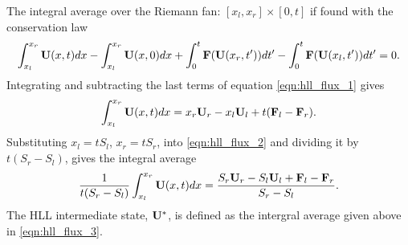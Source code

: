 

%

\label{app:hll_flux}

The integral average over the Riemann fan: $[x_l,x_r] \times [0,t]$ if found with the conservation law
\begin{gather}
\label{eqn:hll_flux_1}
\int_{x_l}^{x_r} \mathbf{U}(x,t) dx - \int_{x_l}^{x_r} \mathbf{U}(x,0) dx + \int_{0}^{t} \mathbf{F}(\mathbf{U}(x_r,t')) dt'
- \int_{0}^{t} \mathbf{F}(\mathbf{U}(x_l,t')) dt' = 0.
\end{gather}
Integrating and subtracting the last terms of equation \eqref{eqn:hll_flux_1} gives
\begin{gather}
\label{eqn:hll_flux_2}
\int_{x_l}^{x_r} \mathbf{U}(x,t) dx = x_r\mathbf{U}_r - x_l\mathbf{U}_l + t(\mathbf{F}_l - \mathbf{F}_r).
\end{gather}
Substituting $x_l  = t S_l$, $x_r  = t S_r$, into \eqref{eqn:hll_flux_2} and dividing it by $t(S_r - S_l)$, gives the integral average 
\begin{gather}
\label{eqn:hll_flux_3}
\frac{1}{t(S_r - S_l)}\int_{x_l}^{x_r} \mathbf{U}(x,t) dx = \frac{S_r\mathbf{U}_r - S_l\mathbf{U}_l + \mathbf{F}_l - \mathbf{F}_r}{S_r - S_l}.
\end{gather}
The HLL intermediate state, $\mathbf{U}^*$, is defined as the intergral average given above in \eqref{eqn:hll_flux_3}.

